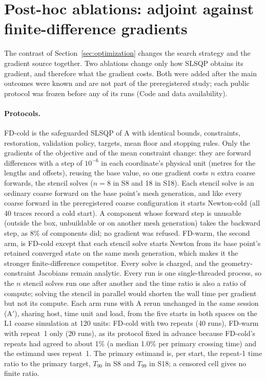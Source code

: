 \section{Post-hoc ablations: adjoint against finite-difference gradients}\label{sec:exp2-fd}
The contrast of Section~\ref{sec:optimization} changes the search strategy
and the gradient source together. Two ablations change only how SLSQP
obtains its gradient, and therefore what the gradient costs. Both were
added after the main outcomes were known and are not part of the
preregistered study; each public protocol was frozen before any of its
runs (Code and data availability).

\paragraph{Protocols.}
FD-cold is the safeguarded SLSQP of A with identical bounds, constraints,
restoration, validation policy, targets, mean floor and stopping rules.
Only the gradients of the objective and of the mean constraint change: they
are forward differences with a step of $10^{-6}$ in each coordinate's
physical unit (metres for the lengths and offsets), reusing the base value,
so one gradient costs $n$ extra coarse forwards, the stencil solves
($n=8$ in S8 and 18 in S18). Each stencil solve is an ordinary coarse
forward on the base point's mesh generation, and like every coarse
forward in the preregistered coarse configuration it starts Newton-cold
(all 40 traces record a cold start). A component whose forward step is
unusable (outside the box, unbuildable or on another mesh generation) takes
the backward step, as 8\% of components did; no gradient was refused.
FD-warm, the second arm, is FD-cold except that each stencil solve starts
Newton from its base point's retained converged state on the same mesh
generation, which makes it the stronger finite-difference competitor.
Every solve is charged, and the geometry-constraint Jacobians remain
analytic. Every run is one single-threaded process, so the $n$ stencil
solves run one after another and the time ratio is also a ratio of
compute; solving the stencil in parallel would shorten the wall time per
gradient but not its compute. Each arm runs with A rerun unchanged in the
same session (A$'$), sharing host, time unit and load, from the five starts
in both spaces on the L1 coarse simulation at 120 units: FD-cold with two
repeats (40 runs), FD-warm with repeat~1 only (20 runs), as its protocol
fixed in advance because FD-cold's repeats had agreed to about 1\% (a
median 1.0\% per primary crossing time) and the estimand uses repeat~1. The
primary estimand is, per start, the repeat-1 time ratio to the primary
target, $T_{90}$ in S8 and $T_{99}$ in S18; a censored cell gives no
finite ratio.

